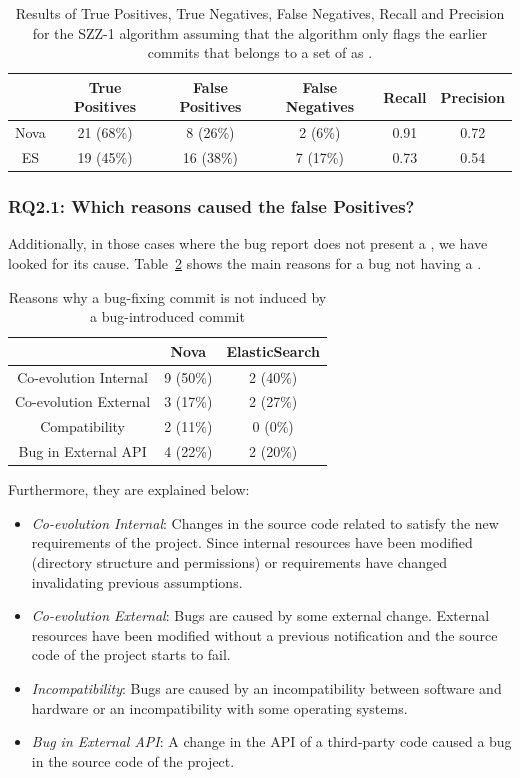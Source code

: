 \documentclass[a4paper, 12pt]{book}
\begin{document}
\begin{table}[!t]
	\renewcommand{\arraystretch}{1.3}
	\caption{Results of True Positives, True Negatives, False Negatives, Recall and Precision for the SZZ-1 algorithm assuming that the algorithm only flags the earlier commits that belongs to a set of  as \BIC.}
	\label{realSZZ2}
	\centering
	\begin{tabular}{|c|c|c|c|c|c|}
		\hline
 	 	&  True Positives & False Positives & False Negatives & Recall & Precision \\
		\hline
		\hline
		Nova & 21 (68\%) & 8 (26\%) & 2 (6\%) & 0.91 & 0.72\\
		\hline
		ES &  19 (45\%) & 16 (38\%) & 7 (17\%)& 0.73 & 0.54 \\
		\hline
	\end{tabular}
\end{table}

\subsubsection{RQ2.1: Which reasons caused the false Positives?}
Additionally, in those cases where the bug report does not present a \BIC, we have looked for its cause. Table~\ref{tablereasosNoBIC} shows the main reasons for a bug not having a \BIC. 
\begin{table}[!t]
	\renewcommand{\arraystretch}{1.3}
	\caption{ Reasons why a bug-fixing commit is not induced by a bug-introduced commit }
	\label{tablereasosNoBIC}
	\centering
	\begin{tabular}{|c|c|c|}
		\hline
  		& Nova & ElasticSearch  \\
		\hline
		\hline
		Co-evolution Internal & 9 (50\%) & 2 (40\%) \\
		\hline
		Co-evolution External  & 3 (17\%) & 2 (27\%)\\
		\hline
		Compatibility & 2 (11\%) & 0 (0\%)\\
		\hline
		Bug in External API & 4 (22\%) & 2 (20\%)\\
		\hline
	\end{tabular}
\end{table}
Furthermore, they are explained below:
\begin{itemize}
 	\item \textit{Co-evolution Internal}: Changes in the source code related to satisfy the new requirements of the project. Since internal resources have been modified (directory structure and permissions) or requirements have changed invalidating previous assumptions.  	
	\item \textit{Co-evolution External}: Bugs are caused by some external change. External resources have been modified without a previous notification and the source code of the project starts to fail.
  	\item \textit{Incompatibility}: Bugs are caused by an incompatibility between software and hardware or an incompatibility with some operating systems.
  	\item \textit{Bug in External API}: A change in the API of a third-party code caused a bug in the source code of the project.
\end{itemize}
\end{document}
